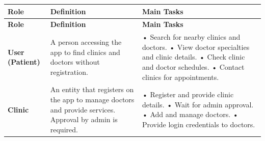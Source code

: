 \documentclass[12pt]{report}
\begin{document}
\begin{longtable}{|p{3cm}|p{6cm}|p{6cm}|}

	\hline
	\rowcolor[HTML]{C0C0C0}
	\hspace*{1cm}\textbf{Role}                                                                                 & \hspace*{1.9cm} \textbf{Definition}                                                 & \hspace*{1.9cm}\textbf{Main Tasks} \\
	\hline
	\endfirsthead

	\hline
	\rowcolor[HTML]{C0C0C0}
	\hspace*{1cm}\textbf{Role}                                                                                 & \hspace*{1.9cm} \textbf{Definition}                                                 & \hspace*{1.9cm}\textbf{Main Tasks} \\
	\hline
	\endhead

	\hspace*{0.1cm}\textbf{User (Patient)}                                                                     & A person accessing the app to find clinics and doctors without registration.        &
	• Search for nearby clinics and doctors.\newline
	• View doctor specialties and clinic details.\newline
	• Check clinic and doctor schedules.\newline
	• Contact clinics for appointments.                                                                                                                                                                                                   \\
	\hline

	\hspace*{0.9cm}\textbf{Clinic}                                                                             &
	An entity that registers on the app to manage doctors and provide services. Approval by admin is required. &
	• Register and provide clinic details.\newline
	• Wait for admin approval.\newline
	• Add and manage doctors.\newline
	• Provide login credentials to doctors.                                                                                                                                                                                               \\
	\hline



\end{longtable}
\end{document}
